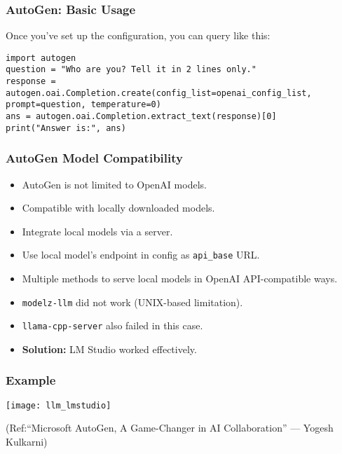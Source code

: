 \begin{frame}[fragile]\frametitle{AutoGen: Basic Usage}
Once you’ve set up the configuration, you can query like this:

\begin{lstlisting}
import autogen
question = "Who are you? Tell it in 2 lines only."
response = autogen.oai.Completion.create(config_list=openai_config_list, prompt=question, temperature=0)
ans = autogen.oai.Completion.extract_text(response)[0]
print("Answer is:", ans)
\end{lstlisting}
\end{frame}

\begin{frame}[fragile]\frametitle{AutoGen Model Compatibility}
    \begin{itemize}
        \item AutoGen is not limited to OpenAI models.
        \item Compatible with locally downloaded models.
        \item Integrate local models via a server.
        \item Use local model's endpoint in config as \texttt{api\_base} URL.
        \item Multiple methods to serve local models in OpenAI API-compatible ways.
        \item \texttt{modelz-llm} did not work (UNIX-based limitation).
        \item \texttt{llama-cpp-server} also failed in this case.
        \item \textbf{Solution:} LM Studio worked effectively.
    \end{itemize}
\end{frame}

\begin{frame}[fragile]\frametitle{Example}

	
	\begin{center}
	\texttt{[image: llm\_lmstudio]}
	\end{center}
	
{\tiny (Ref:“Microsoft AutoGen, A Game-Changer in AI Collaboration” — Yogesh Kulkarni)}


\end{frame}




